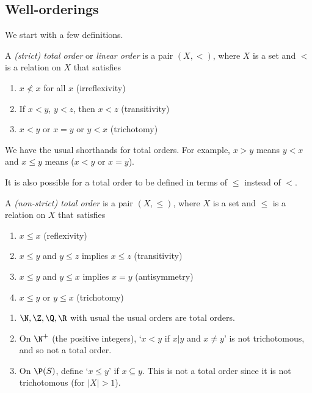 \documentclass[a4paper]{article}
\begin{document}
\subsection{Well-orderings}
We start with a few definitions.
\begin{defi}
  A \emph{(strict) total order} or \emph{linear order} is a pair $(X, <)$, where $X$ is a set and $<$ is a relation on $X$ that satisfies
  \begin{enumerate}
    \item $x \not< x$ for all $x$ \hfill (irreflexivity)
    \item If $x < y$, $y < z$, then $x < z$ \hfill (transitivity)
    \item $x < y$ or $x = y$ or $y < x$ \hfill (trichotomy)
  \end{enumerate}
\end{defi}

We have the usual shorthands for total orders. For example, $x > y$ means $y < x$ and $x \leq y$ means ($x < y$ or $x = y$).

It is also possible for a total order to be defined in terms of $\leq$ instead of $<$.
\begin{defi}
  A \emph{(non-strict) total order} is a pair $(X, \leq)$, where $X$ is a set and $\leq$ is a relation on $X$ that satisfies
  \begin{enumerate}
    \item $x \leq x$ \hfill (reflexivity)
    \item $x\leq y$ and $y \leq z$ implies $x\leq z$ \hfill (transitivity)
    \item $x\leq y$ and $y\leq x$ implies $x = y$ \hfill (antisymmetry)
    \item $x\leq y$ or $y\leq x$ \hfill (trichotomy)
  \end{enumerate}
\end{defi}

\begin{eg}\leavevmode
  \begin{enumerate}
    \item $\N, \Z, \Q, \R$ with usual the usual orders are total orders.
    \item On $\N^+$ (the positive integers), `$x < y$ if $x|y$ and $x \not=y$' is not trichotomous, and so not a total order.
    \item On $\P(S)$, define `$x\leq y$' if $x\subseteq y$. This is not a total order since it is not trichotomous (for $|X| > 1$).
  \end{enumerate}
\end{eg}
\end{document}
